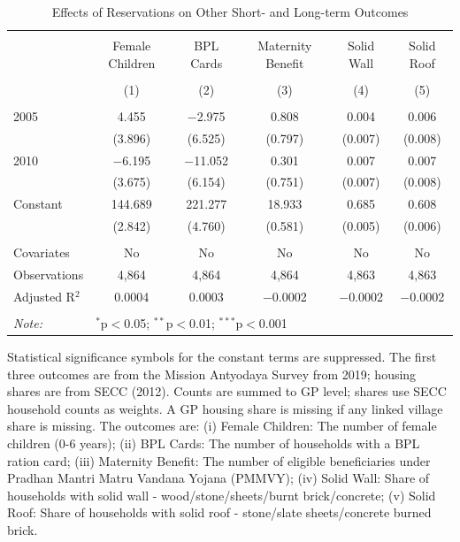 \begin{table}[!htbp]
\centering
\begin{threeparttable}

  \caption{Effects of Reservations on Other Short- and Long-term Outcomes} 
  \label{raj_shrug_other_05_10} 
\scriptsize 
\begin{tabular}{@{\extracolsep{0pt}}lccccc} 
\\[-1.8ex]\hline 
\hline \\[-1.8ex] 
 & Female Children & BPL Cards & Maternity Benefit & Solid Wall & Solid Roof \\ 
\\[-1.8ex] & (1) & (2) & (3) & (4) & (5)\\ 
\hline \\[-1.8ex] 
 2005 & 4.455 & $-$2.975 & 0.808 & 0.004 & 0.006 \\ 
  & (3.896) & (6.525) & (0.797) & (0.007) & (0.008) \\ 
  2010 & $-$6.195 & $-$11.052 & 0.301 & 0.007 & 0.007 \\ 
  & (3.675) & (6.154) & (0.751) & (0.007) & (0.008) \\ 
  Constant & 144.689 & 221.277 & 18.933 & 0.685 & 0.608 \\ 
  & (2.842) & (4.760) & (0.581) & (0.005) & (0.006) \\ 
 \hline \\[-1.8ex] 
Covariates & No & No & No & No & No \\ 
Observations & 4,864 & 4,864 & 4,864 & 4,863 & 4,863 \\ 
Adjusted R$^{2}$ & 0.0004 & 0.0003 & $-$0.0002 & $-$0.0002 & $-$0.0002 \\ 
\hline 
\hline \\[-1.8ex] 
\textit{Note:}  & \multicolumn{5}{l}{$^{*}$p$<$0.05; $^{**}$p$<$0.01; $^{***}$p$<$0.001} \\ 
\end{tabular} 
\begin{tablenotes}[flushleft]
\scriptsize
\item[] Statistical significance symbols for the constant terms are suppressed. The first three outcomes are from the Mission Antyodaya Survey from
    2019; housing shares are from SECC (2012). Counts are summed to GP
    level; shares use SECC household counts as weights. A GP housing
    share is missing if any linked village share is missing. The outcomes
    are: (i) Female Children: The number of female children (0-6 years);
    (ii) BPL Cards: The number of households with a BPL ration card;
    (iii) Maternity Benefit: The number of eligible beneficiaries under
    Pradhan Mantri Matru Vandana Yojana (PMMVY); (iv) Solid Wall: Share
    of households with solid wall - wood/stone/sheets/burnt
    brick/concrete; (v) Solid Roof: Share of households with solid roof -
    stone/slate sheets/concrete burned brick.
\end{tablenotes}
\end{threeparttable}
\end{table}
